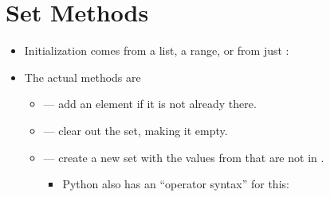 \documentclass[letterpaper,10pt,english]{sphinxmanual}
\begin{document}
\section{Set Methods}
\label{\detokenize{lecture_notes/lec15_sets:set-methods}}\begin{itemize}
\item {} 
Initialization comes from a list, a range, or from just :

\begin{sphinxVerbatim}[commandchars=\\\{\}]
  
    
  \PYG{p}{[}        \PYG{p}{]}
  
\end{sphinxVerbatim}

\item {} 
The actual methods are
\begin{itemize}
\item {} 
 — add an element if it is not already there.

\item {} 
 — clear out the set, making it empty.

\item {} 
 — create a new set with the values from
 that are not in .
\begin{itemize}
\item {} 
Python also has an “operator syntax” for this:


\end{itemize}
\end{itemize}
\end{itemize}
\end{document}
